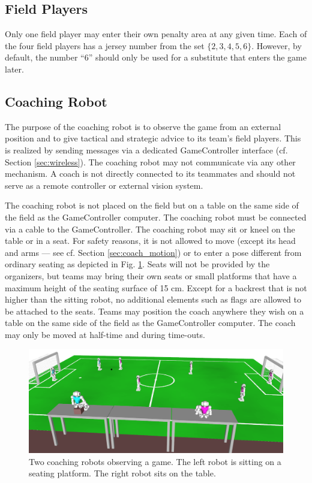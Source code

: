 \documentclass[12pt]{article}
\newcommand{\cf}{\mbox{cf.}\xspace}
\begin{document}
\subsection{Field Players}
\label{sec:field_players}
Only one field player may enter their own penalty area at any given time. Each of the four field players has a jersey number from the set $\{2, 3, 4, 5, 6\}$. However, by default, the number ``6'' should only be used for a substitute that enters the game later.

\subsection{Coaching Robot}
\label{sec:coaching_robot}

The purpose of the coaching robot is to observe the game from an external position and to give tactical and strategic advice to its team's field players. This is realized by sending messages via a dedicated GameController interface (\cf Section \ref{sec:wireless}). The coaching robot may not communicate via any other mechanism.  A coach is not directly connected to its teammates and should not serve as a remote controller or external vision system.

The coaching robot is not placed on the field but on a table on the same side of the field as the GameController computer.  The coaching robot must be connected via a cable to the GameController. The coaching robot may sit or kneel on the table or in a seat. For safety reasons, it is not allowed to move (except its head and arms --- see \cf Section \ref{sec:coach_motion}) or to enter a pose different from ordinary seating as depicted in Fig. \ref{fig:coaches}.  Seats will not be provided by the organizers, but teams may bring their own seats or small platforms that have a maximum height of the seating surface of 15 cm. Except for a backrest that is not higher than the sitting robot, no additional elements such as flags are allowed to be attached to the seats. Teams may position the coach anywhere they wish on a table on the same side of the field as the GameController computer.  The coach may only be moved at half-time and during time-outs.

\begin{figure}[t]
  \centerline{\includegraphics[width=\columnwidth]{figs/coaching-robots}}
  \caption{Two coaching robots observing a game. The left robot is sitting on a seating platform. The right robot sits on the table.}
  \label{fig:coaches}
\end{figure}
 
\end{document}
